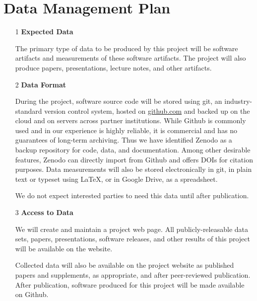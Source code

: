 


\section*{Data Management Plan}

\label{sec:datamgmt}

\begin{enumerate}
\item [1] \textbf{Expected Data}

The primary type of data to be produced by this project will be
software artifacts and measurements of these software artifacts.
The project will also produce papers, presentations, lecture notes,
and other artifacts.
\item [2] \textbf{Data Format}

During the project, software source code will be stored using git, an industry-standard
version control system, hosted on \url{github.com} and
backed up on the cloud and
on servers across partner institutions. While Github is commonly used and in our experience is highly reliable, it is commercial and has no guarantees of long-term archiving. Thus we have identified Zenodo as a backup repository for code, data, and documentation. Among other desirable features, Zenodo can directly import from Github and offers DOIs for citation purposes.
%
Data measurements
will also be stored electronically in git,
in plain text or typeset using \LaTeX, or in Google
Drive, as a spreadsheet.

We do not expect interested parties to need this data until after publication.

\item [3] \textbf{Access to Data}

We will create and maintain a project web page. %
All publicly-releasable data sets,
papers, presentations, software releases, and other results of this
project will be available on the website.

Collected data will also be available on the project website as published
papers and supplements, as appropriate, and after peer-reviewed
publication.
After publication, software produced for this project will be
made available on Github.



\end{enumerate}
